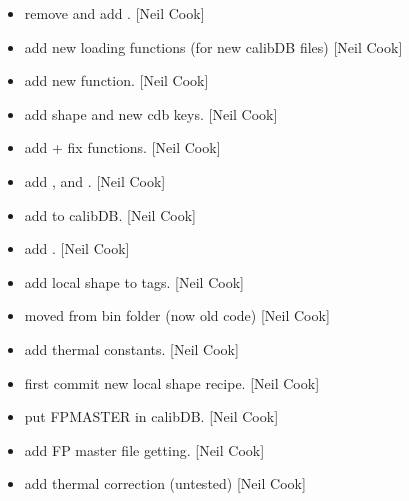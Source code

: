 \documentclass[a4paper,10pt,english]{report}
\begin{document}
\label{\detokenize{misc/changelog:id144}}\begin{itemize}
\item {} 
 \sphinxhyphen{} remove  and add
. {[}Neil Cook{]}

\item {} 
 \sphinxhyphen{} add new loading functions (for new calibDB files)
{[}Neil Cook{]}

\item {} 
 \sphinxhyphen{} add new  function. {[}Neil
Cook{]}

\item {} 
 \sphinxhyphen{} add shape and new cdb keys. {[}Neil Cook{]}

\item {} 
 \sphinxhyphen{} add  + fix  functions.
{[}Neil Cook{]}

\item {} 
 \sphinxhyphen{} add ,  and
. {[}Neil Cook{]}

\item {} 
 \sphinxhyphen{} add  to calibDB. {[}Neil Cook{]}

\item {} 
 \sphinxhyphen{} add . {[}Neil Cook{]}

\item {} 
 \sphinxhyphen{} add local shape to tags. {[}Neil Cook{]}

\item {} 
 \sphinxhyphen{} moved from bin folder (now old code) {[}Neil Cook{]}

\item {} 
 \sphinxhyphen{} add thermal constants. {[}Neil Cook{]}

\item {} 
 \sphinxhyphen{} first commit new local shape recipe. {[}Neil Cook{]}

\item {} 
 \sphinxhyphen{} put FPMASTER in calibDB. {[}Neil Cook{]}

\item {} 
 \sphinxhyphen{} add FP master file getting. {[}Neil Cook{]}

\item {} 
 \sphinxhyphen{} add thermal correction (untested) {[}Neil
Cook{]}

\end{itemize}
\end{document}
